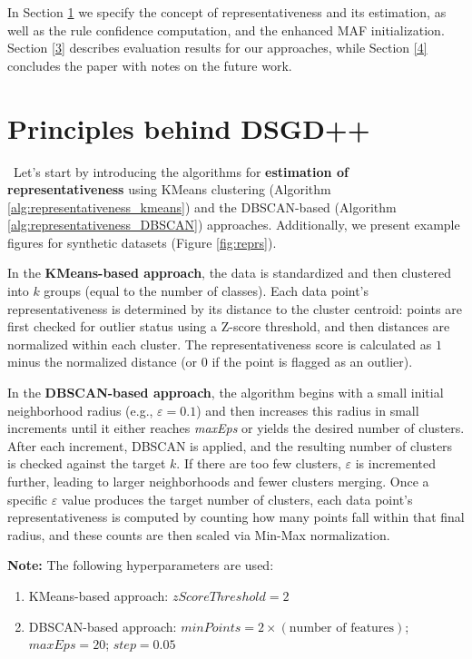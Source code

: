 \documentclass[10pt,a4paper,oneside]{article}
\begin{document}
{\color{black}In Section \ref{2} we specify the concept of representativeness and its estimation, as well as the rule confidence computation, and the enhanced MAF initialization. Section \ref{3} describes evaluation results for our approaches, while Section \ref{4} concludes the paper with notes on the future work.}
\section{Principles behind DSGD++}\label{2}
\
{\color{black}Let's start by introducing} the algorithms for \textbf{estimation of representativeness} using KMeans clustering (Algorithm \ref{alg:representativeness_kmeans}) and the DBSCAN-based (Algorithm \ref{alg:representativeness_DBSCAN}) approaches. Additionally, we present example figures for synthetic datasets (Figure \ref{fig:reprs}).

In the \textbf{KMeans-based approach}, the data is standardized and then clustered into \(k\) groups (equal to the number of classes). Each data point’s representativeness is determined by its distance to the cluster centroid: points are first checked for outlier status using a Z-score threshold, and then distances are normalized within each cluster. The representativeness score is calculated as \(1\) minus the normalized distance (or \(0\) if the point is flagged as an outlier).

In the \textbf{DBSCAN-based approach}, the algorithm begins with a small initial neighborhood radius (e.g., \(\varepsilon = 0.1\)) and then increases this radius in small increments until it either reaches \textit{maxEps} or yields the desired number of clusters. After each increment, DBSCAN is applied, and the resulting number of clusters is checked against the target \(k\). If there are too few clusters, \(\varepsilon\) is incremented further, leading to larger neighborhoods and fewer clusters merging. Once a specific \(\varepsilon\) value produces the target number of clusters, each data point’s representativeness is computed by counting how many points fall within that final radius, and these counts are then scaled via Min-Max normalization.

\textbf{Note:} The following hyperparameters are used:
\begin{enumerate}
    \item KMeans-based approach: $zScoreThreshold = 2$
    \item DBSCAN-based approach: $minPoints = 2 \times (\text{number of features})$; $maxEps = 20$; $step = 0.05$ 
\end{enumerate}
\end{document}
